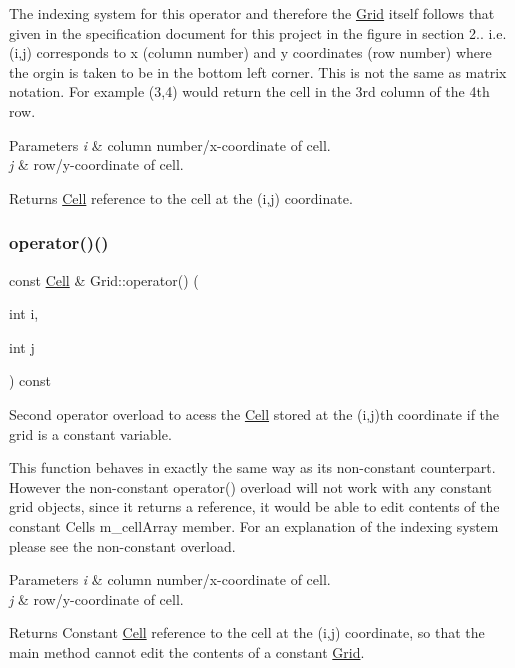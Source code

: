 The indexing system for this operator and therefore the \hyperlink{class_grid}{Grid} itself follows that given in the specification document for this project in the figure in section 2.. i.\+e. (i,j) corresponds to x (column number) and y coordinates (row number) where the orgin is taken to be in the bottom left corner. This is not the same as matrix notation. For example (3,4) would return the cell in the 3rd column of the 4th row.


\begin{DoxyParams}{Parameters}
{\em i} & column number/x-\/coordinate of cell. \\
\hline
{\em j} & row/y-\/coordinate of cell.\\
\hline
\end{DoxyParams}
\begin{DoxyReturn}{Returns}
\hyperlink{class_cell}{Cell} reference to the cell at the (i,j) coordinate. 
\end{DoxyReturn}
\mbox{\label{class_grid_aa89f5c17cb78658f3b82a3b2d93aeb92}} 
\subsubsection{\texorpdfstring{operator()()}{operator()()}\hspace{0.1cm}{\footnotesize\ttfamily [2/2]}}
{\footnotesize\ttfamily const \hyperlink{class_cell}{Cell} \& Grid\+::operator() (\begin{DoxyParamCaption}\item[{int}]{i,  }\item[{int}]{j }\end{DoxyParamCaption}) const}



Second operator overload to acess the \hyperlink{class_cell}{Cell} stored at the (i,j)th coordinate if the grid is a constant variable. 

This function behaves in exactly the same way as its non-\/constant counterpart. However the non-\/constant operator() overload will not work with any constant grid objects, since it returns a reference, it would be able to edit contents of the constant Cells m\+\_\+cell\+Array member. For an explanation of the indexing system please see the non-\/constant overload.


\begin{DoxyParams}{Parameters}
{\em i} & column number/x-\/coordinate of cell. \\
\hline
{\em j} & row/y-\/coordinate of cell.\\
\hline
\end{DoxyParams}
\begin{DoxyReturn}{Returns}
Constant \hyperlink{class_cell}{Cell} reference to the cell at the (i,j) coordinate, so that the main method cannot edit the contents of a constant \hyperlink{class_grid}{Grid}. 
\end{DoxyReturn}
\mbox{\label{class_grid_aae7b118be13f65bf2e3a72881d8a06df}} 
